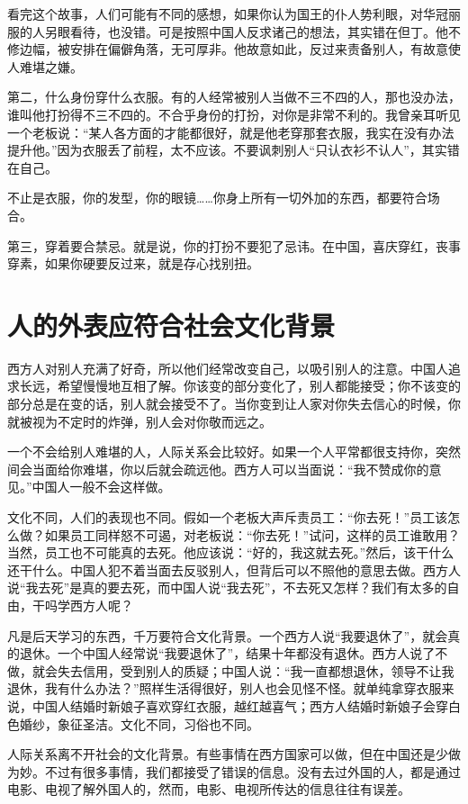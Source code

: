 \documentclass[fontset=fandol, a4paper, 12pt, openright]{ctexbook}
\begin{document}
看完这个故事，人们可能有不同的感想，如果你认为国王的仆人势利眼，对华冠丽服的人另眼看待，也没错。可是按照中国人反求诸己的想法，其实错在但丁。他不修边幅，被安排在偏僻角落，无可厚非。他故意如此，反过来责备别人，有故意使人难堪之嫌。

第二，什么身份穿什么衣服。有的人经常被别人当做不三不四的人，那也没办法，谁叫他打扮得不三不四的。不合乎身份的打扮，对你是非常不利的。我曾亲耳听见一个老板说：“某人各方面的才能都很好，就是他老穿那套衣服，我实在没有办法提升他。”因为衣服丢了前程，太不应该。不要讽刺别人“只认衣衫不认人”，其实错在自己。

不止是衣服，你的发型，你的眼镜……你身上所有一切外加的东西，都要符合场合。

第三，穿着要合禁忌。就是说，你的打扮不要犯了忌讳。在中国，喜庆穿红，丧事穿素，如果你硬要反过来，就是存心找别扭。

\section{人的外表应符合社会文化背景}

西方人对别人充满了好奇，所以他们经常改变自己，以吸引别人的注意。中国人追求长远，希望慢慢地互相了解。你该变的部分变化了，别人都能接受；你不该变的部分总是在变的话，别人就会接受不了。当你变到让人家对你失去信心的时候，你就被视为不定时的炸弹，别人会对你敬而远之。

一个不会给别人难堪的人，人际关系会比较好。如果一个人平常都很支持你，突然间会当面给你难堪，你以后就会疏远他。西方人可以当面说：“我不赞成你的意见。”中国人一般不会这样做。

文化不同，人们的表现也不同。假如一个老板大声斥责员工：“你去死！”员工该怎么做？如果员工同样怒不可遏，对老板说：“你去死！”试问，这样的员工谁敢用？当然，员工也不可能真的去死。他应该说：“好的，我这就去死。”然后，该干什么还干什么。中国人犯不着当面去反驳别人，但背后可以不照他的意思去做。西方人说“我去死”是真的要去死，而中国人说“我去死”，不去死又怎样？我们有太多的自由，干吗学西方人呢？

凡是后天学习的东西，千万要符合文化背景。一个西方人说“我要退休了”，就会真的退休。一个中国人经常说“我要退休了”，结果十年都没有退休。西方人说了不做，就会失去信用，受到别人的质疑；中国人说：“我一直都想退休，领导不让我退休，我有什么办法？”照样生活得很好，别人也会见怪不怪。就单纯拿穿衣服来说，中国人结婚时新娘子喜欢穿红衣服，越红越喜气；西方人结婚时新娘子会穿白色婚纱，象征圣洁。文化不同，习俗也不同。

人际关系离不开社会的文化背景。有些事情在西方国家可以做，但在中国还是少做为妙。不过有很多事情，我们都接受了错误的信息。没有去过外国的人，都是通过电影、电视了解外国人的，然而，电影、电视所传达的信息往往有误差。
\end{document}
